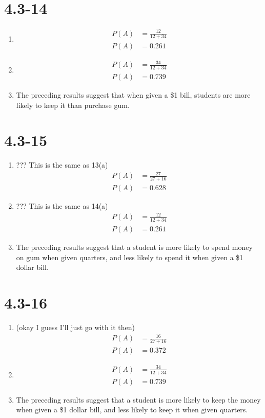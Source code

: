 \documentclass[12pt,fleqn]{article}
\newcommand{\chapter}{4.3}
\newcommand{\problem}[1]{\vspace{5ex}\section*{\chapter-#1}}
\begin{document}
\problem{14}
\begin{enumerate}[label=\alph*.]
\item
  \begin{align*}
    P(A) &= \frac{12}{12 + 34} \\
    P(A) &= 0.261
  \end{align*}

\item
  \begin{align*}
    P(A) &= \frac{34}{12 + 34} \\
    P(A) &= 0.739
  \end{align*}

\item The preceding results suggest that when given a \$1 bill, students are more likely to keep it than purchase gum.
\end{enumerate}


\problem{15}
\begin{enumerate}[label=\alph*.]
\item
  ??? This is the same as 13(a)
  \begin{align*}
    P(A) &= \frac{27}{27 + 16} \\
    P(A) &= 0.628
  \end{align*}

\item
   ??? This is the same as 14(a)
  \begin{align*}
    P(A) &= \frac{12}{12 + 34} \\
    P(A) &= 0.261
  \end{align*}

\item The preceding results suggest that a student is more likely to spend money on gum when given quarters, and less likely to spend it when given a \$1 dollar bill.
\end{enumerate}


\problem{16}
\begin{enumerate}[label=\alph*.]
\item
  (okay I guess I'll just go with it then)
  \begin{align*}
    P(A) &= \frac{16}{27 + 16} \\
    P(A) &= 0.372
  \end{align*}

\item
  \begin{align*}
    P(A) &= \frac{34}{12 + 34} \\
    P(A) &= 0.739
  \end{align*}

\item The preceding results suggest that a student is more likely to keep the money when given a \$1 dollar bill, and less likely to keep it when given quarters.
\end{enumerate}
\end{document}
